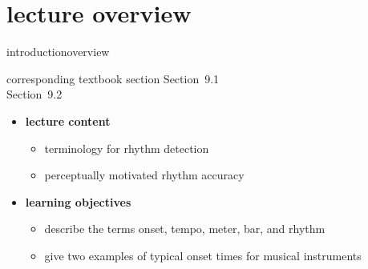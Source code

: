 


\subtitle{Module 9.1: Introduction to Tempo \& Rhythm Terminology}


	

    \section[overview]{lecture overview}
        \begin{frame}{introduction}{overview}
            \begin{block}{corresponding textbook section}
                    Section~9.1\\
                    Section~9.2
            \end{block}

            \begin{itemize}
                \item   \textbf{lecture content}
                    \begin{itemize}
                        \item   terminology for rhythm detection
                        \item   perceptually motivated rhythm accuracy
                    \end{itemize}
                \bigskip
                \item<2->   \textbf{learning objectives}
                    \begin{itemize}
                        \item   describe the terms onset, tempo, meter, bar, and rhythm
                        \item   give two examples of typical onset times for musical instruments
                    \end{itemize}
            \end{itemize}
        \end{frame}

